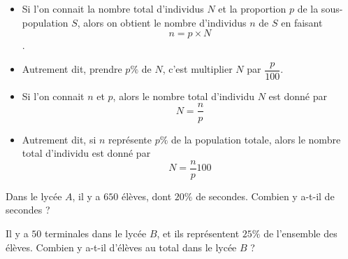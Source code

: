 \documentclass{article}
\begin{document}
\begin{remark}
\hfill
\begin{itemize}
\item Si l'on connait la nombre total d'individus $N$ et la proportion $p$ de la sous-population $S$, alors on obtient le nombre d'individus $n$ de $S$ en faisant
\begin{equation*}
n = p \times N
\end{equation*}.
\item Autrement dit, prendre $p \%$ de $N$, c'est multiplier $N$ par $\dfrac{p}{100}$.
\item Si l'on connait $n$ et $p$, alors le nombre total d'individu $N$ est donné par
\begin{equation*}
N = \dfrac{n}{p}
\end{equation*}
\item Autrement dit, si $n$ représente $p \%$ de la population totale, alors le nombre total d'individu est donné par
\begin{equation*}
N = \dfrac{n}{p}100
\end{equation*}
\end{itemize}
\end{remark}
\begin{example}
\hfill
\begin{enumquestions}
\item Dans le lycée $A$, il y a $650$ élèves, dont $20\%$ de secondes. Combien y a-t-il de secondes ?
\item Il y a $50$ terminales dans le lycée $B$, et ils représentent $25\%$  de l'ensemble des élèves. Combien y a-t-il d'élèves au total dans le lycée $B$ ?
\end{enumquestions}

\emptybox{4cm}
\end{example}
\end{document}
